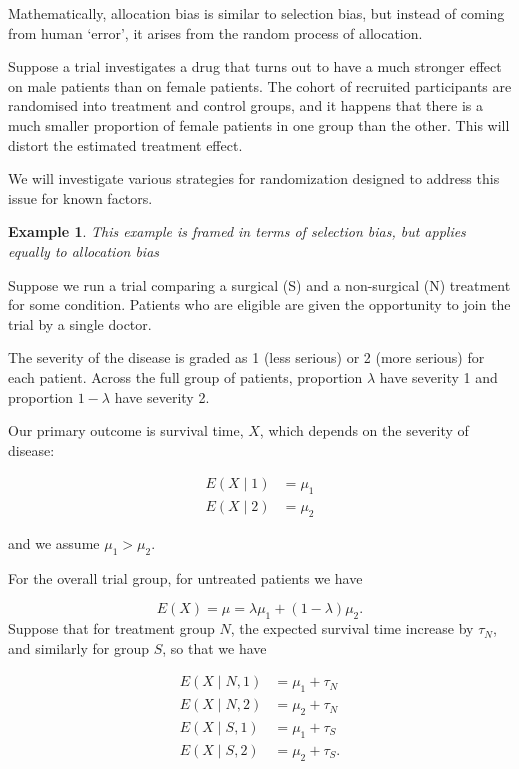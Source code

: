 \documentclass[
  openany]{book}
\theoremstyle{definition}
\theoremstyle{definition}
\newtheorem{example}{Example}[chapter]
\theoremstyle{definition}
\theoremstyle{definition}
\theoremstyle{remark}
\begin{document}
Mathematically, allocation bias is similar to selection bias, but instead of coming from human `error', it arises from the random process of allocation.

Suppose a trial investigates a drug that turns out to have a much stronger effect on male patients than on female patients. The cohort of recruited participants are randomised into treatment and control groups, and it happens that there is a much smaller proportion of female patients in one group than the other. This will distort the estimated treatment effect.

We will investigate various strategies for randomization designed to address this issue for known factors.

\begin{example}
\emph{This example is framed in terms of selection bias, but applies equally to allocation bias}

Suppose we run a trial comparing a surgical (S) and a non-surgical (N) treatment for some condition. Patients who are eligible are given the opportunity to join the trial by a single doctor.

The severity of the disease is graded as 1 (less serious) or 2 (more serious) for each patient. Across the full group of patients, proportion \(\lambda\) have severity 1 and proportion \(1-\lambda\) have severity 2.

Our primary outcome is survival time, \(X\), which depends on the severity of disease:

\begin{align*}
E\left(X\mid{1}\right) & = \mu_1\\
E\left(X\mid{2}\right) & = \mu_2
\end{align*}

and we assume \(\mu_1>\mu_2\).

For the overall trial group, for untreated patients we have

\[ E\left(X\right) = \mu = \lambda \mu_1 + \left(1-\lambda\right)\mu_2.\]
Suppose that for treatment group \(N\), the expected survival time increase by \(\tau_N\), and similarly for group \(S\), so that we have

\begin{align*}
E\left(X\mid{N,1}\right) & = \mu_1 + \tau_N\\
E\left(X\mid{N,2}\right) & = \mu_2 + \tau_N\\
E\left(X\mid{S,1}\right) & = \mu_1 + \tau_S\\
E\left(X\mid{S,2}\right) & = \mu_2 + \tau_S.
\end{align*}


\end{example}
\end{document}
